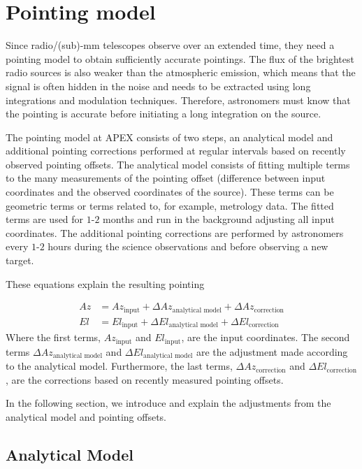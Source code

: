\section{Pointing model}\label{sec:pt_model}
Since radio/(sub)-mm telescopes observe over an extended time, they need a pointing model to obtain sufficiently accurate pointings.
The flux of the brightest radio sources is also weaker than the atmospheric emission,
which means that the signal is often hidden in the noise and needs to be extracted using long integrations and modulation techniques.
Therefore, astronomers must know that the pointing is accurate before initiating a long integration on the source.

The pointing model at APEX consists of two steps, an analytical model and additional pointing corrections performed at regular intervals based on recently observed pointing offsets.
The analytical model consists of fitting multiple terms to the many measurements of the pointing offset (difference between input coordinates and the observed coordinates of the source).
These terms can be geometric terms or terms related to, for example, metrology data.
The fitted terms are used for $1$-$2$ months and run in the background adjusting all input coordinates.
The additional pointing corrections are performed by astronomers every $1$-$2$ hours during the science observations and before observing a new target.

These equations explain the resulting pointing

\begin{align}
    Az &= Az_\text{input} + \Delta Az_\text{analytical model} + \Delta Az_\text{correction} \\ 
    El &= El_\text{input} + \Delta El_\text{analytical model} + \Delta El_\text{correction}
\end{align}
Where the first terms, $Az_\text{input}$ and $El_\text{input}$, are the input coordinates.
The second terms $\Delta Az_\text{analytical model}$ and $\Delta El_\text{analytical model}$ are the adjustment made according to the analytical model.
Furthermore, the last terms, $\Delta Az_\text{correction}$ and $\Delta El_\text{correction}$, are the corrections based on recently measured pointing offsets.

In the following section, we introduce and explain the adjustments from the analytical model and pointing offsets. 


\subsection{Analytical Model}

